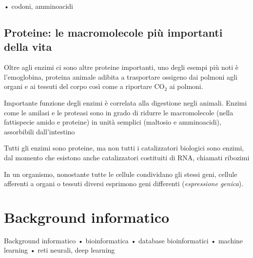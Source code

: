 • codoni, amminoacidi
\subsection{Proteine: le macromolecole più importanti della vita}

\par Oltre agli enzimi ci sono altre proteine importanti, uno degli esempi più noti è l'emoglobina, proteina animale adibita a trasportare ossigeno dai polmoni agli organi e ai tessuti del corpo così come a riportare CO$_{2}$ ai polmoni. 

Importante funzione degli enzimi è correlata alla digestione negli animali. Enzimi come le amilasi e le proteasi sono in grado di ridurre le macromolecole (nella fattispecie amido e proteine) in unità semplici (maltosio e amminoacidi), assorbibili dall'intestino

Tutti gli enzimi sono proteine, ma non tutti i catalizzatori biologici sono enzimi, dal momento che esistono anche catalizzatori costituiti di RNA, chiamati ribozimi

In un organismo, nonostante tutte le cellule condividano gli stessi geni, cellule afferenti a organi o tessuti diversi esprimono geni differenti (\textit{espressione genica}).

\section{Background informatico}

Background informatico
• bioinformatica
• database bioinformatici
• machine learning
• reti neurali, deep learning

\clearpage